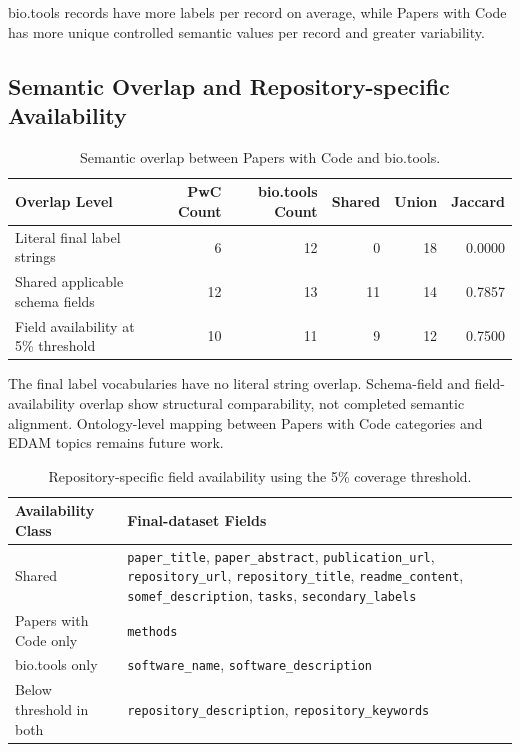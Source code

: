 \documentclass[pdflatex,sn-mathphys-num]{sn-jnl}
\theoremstyle{thmstyleone}%
\theoremstyle{thmstyletwo}%
\theoremstyle{thmstylethree}%
\begin{document}
bio.tools records have more labels per record on average, while Papers with Code has more unique controlled semantic values per record and greater variability.

\subsection{Semantic Overlap and Repository-specific Availability}
\label{subsec:semantic-overlap}

\begin{table}[htbp]
\centering
\small
\caption{Semantic overlap between Papers with Code and bio.tools.}
\label{tab:semantic-overlap-summary}
\begin{tabularx}{\textwidth}{Yrrrrr}
\toprule
Overlap Level & PwC Count & bio.tools Count & Shared & Union & Jaccard \\
\midrule
Literal final label strings & 6 & 12 & 0 & 18 & 0.0000 \\
Shared applicable schema fields & 12 & 13 & 11 & 14 & 0.7857 \\
Field availability at 5\% threshold & 10 & 11 & 9 & 12 & 0.7500 \\
\bottomrule
\end{tabularx}
\end{table}

The final label vocabularies have no literal string overlap. Schema-field and field-availability overlap show structural comparability, not completed semantic alignment. Ontology-level mapping between Papers with Code categories and EDAM topics remains future work.

\begin{table}[htbp]
\centering
\small
\caption{Repository-specific field availability using the 5\% coverage threshold.}
\label{tab:repository-specific-attribute-availability}
\begin{tabularx}{\textwidth}{p{3.2cm}Y}
\toprule
Availability Class & Final-dataset Fields \\
\midrule
Shared & \texttt{paper\_title}, \texttt{paper\_abstract}, \texttt{publication\_url}, \texttt{repository\_url}, \texttt{repository\_title}, \texttt{readme\_content}, \texttt{somef\_description}, \texttt{tasks}, \texttt{secondary\_labels} \\
Papers with Code only & \texttt{methods} \\
bio.tools only & \texttt{software\_name}, \texttt{software\_description} \\
Below threshold in both & \texttt{repository\_description}, \texttt{repository\_keywords} \\
\bottomrule
\end{tabularx}
\end{table}
\end{document}
